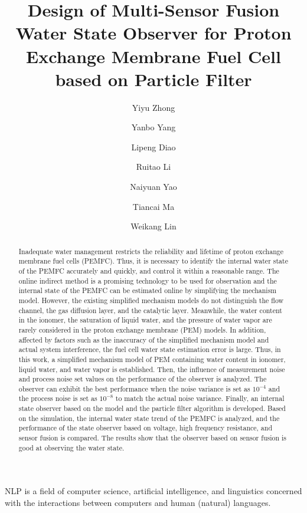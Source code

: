 \documentclass[preprint]{elsarticle}
\title{Design of Multi-Sensor Fusion Water State Observer for Proton Exchange Membrane Fuel Cell based on Particle Filter}
\author[a]{Yiyu Zhong}
\author[a]{Yanbo Yang\corref{mycorrespondingauthor}}
\author[c]{Lipeng Diao}
\author[a]{Ruitao Li}
\author[a]{Naiyuan Yao}
\author[a,b]{Tiancai Ma}
\author[a]{Weikang Lin}
\begin{document}
\begin{abstract}

    Inadequate water management restricts the reliability and lifetime of proton exchange membrane fuel cells (PEMFC). Thus, it is necessary to identify the internal water state of the PEMFC accurately and quickly, and control it within a reasonable range. The online indirect method is a promising technology to be used for observation and the internal state of the PEMFC can be estimated online by simplifying the mechanism model. However, the existing simplified mechanism models do not distinguish the flow channel, the gas diffusion layer, and the catalytic layer. Meanwhile, the water content in the ionomer, the saturation of liquid water, and the pressure of water vapor are rarely considered in the proton exchange membrane (PEM) models. In addition, affected by factors such as the inaccuracy of the simplified mechanism model and actual system interference, the fuel cell water state estimation error is large. Thus, in this work, a simplified mechanism model of PEM containing water content in ionomer, liquid water, and water vapor is established. Then, the influence of measurement noise and process noise set values on the performance of the observer is analyzed. The observer can exhibit the best performance when the noise variance is set as $10^{-4}$ and the process noise is set as $10^{-8}$ to match the actual noise variance. Finally, an internal state observer based on the model and the particle filter algorithm is developed. Based on the simulation, the internal water state trend of the PEMFC is analyzed, and the performance of the state observer based on voltage, high frequency resistance, and sensor fusion is compared. The results show that the observer based on sensor fusion is good at observing the water state. 
\end{abstract}
\maketitle

% 
\renewcommand{\nomname}{List of Abbreviations}


\printnomenclature
NLP is a field of computer science, artificial intelligence, and linguistics concerned with the interactions between computers and human (natural) languages.
% 
% 
\end{document}
